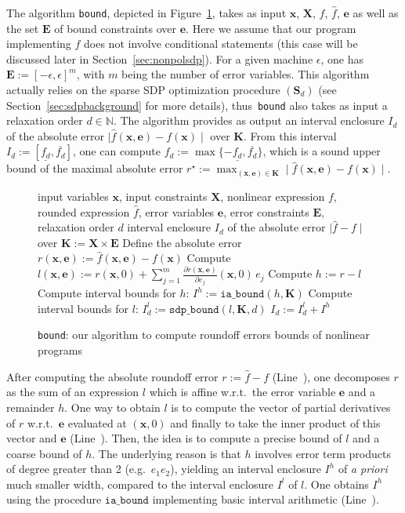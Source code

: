 \documentclass[preprint,fleqn,nocopyrightspace]{sigplanconf}
\newcommand{\code}[1]{\lstinline{#1}}
\newcommand{\N}{\mathbb{N}}
\newcommand{\x}{\mathbf{x}}
\newcommand{\e}{\mathbf{e}}
\def\S{\mathbf{S}}
\def\E{\mathbf{E}}
\def\K{\mathbf{K}}
\def\S{\mathbf{S}}
\def\X{\mathbf{X}}
\newcommand{\iaboundfun}[2]{\mathtt{ia\_bound}(#1, #2)}
\newcommand{\iabound}{\mathtt{ia\_bound}}
\newcommand{\sdpboundfun}[3]{\mathtt{sdp\_bound}(#1, #2, #3)}
\theoremstyle{plain}
\begin{document}
The algorithm \code{bound}, depicted in Figure~\ref{alg:bound}, takes as input $\x$, $\X$, $f$, $\hat{f}$, $\e$ as well as the set $\E$ of bound constraints over $\e$. Here we assume that our program implementing $f$ does not involve conditional statements (this case will be discussed later in Section~\ref{sec:nonpolsdp}). For a given machine $\epsilon$, one has $\E := [-\epsilon, \epsilon]^m$, with $m$ being the number of error variables. This algorithm actually relies on the sparse SDP optimization procedure $(\S_d)$ (see Section~\ref{sec:sdpbackground} for more details), thus~\code{bound} also takes as input a relaxation order $d \in \N$. The algorithm provides as output an interval enclosure $I_d$ of the absolute error $\mid \hat{f}(\x,\e) - f(\x) \mid$ over $\K$. 
From this interval $I_d:= [\underline{f_d}, \overline{f_d}]$, one can compute $f_d := \max \{- \underline{f_d}, \overline{f_d} \}$, which is a sound upper bound of the maximal absolute error $r^\star := \max_{(\x,\e)\in \K} \mid \hat{f}(\x,\e) - f(\x) \mid $.

\begin{figure}[!ht]
\begin{algorithmic}[1]                    
\Require input variables $\x$, input constraints $\X$, nonlinear expression $f$, rounded expression $\hat{f}$, error variables $\e$, error constraints $\E$, relaxation order $d$
\Ensure interval enclosure $I_d$ of the absolute error $\mid \hat{f} - f  \mid$ over $\K := \X \times \E$
\State Define the absolute error $r(\x, \e) := \hat{f}(\x,\e) - f(\x)$ \label{line:r}
\State Compute $l(\x,\e) := r(\x, 0) + \sum_{j=1}^m \frac{\partial r(\x,\e)} {\partial e_j} (\x,0) \, e_j$ \label{line:l}
\State Compute $h := r - l$ \label{line:h}
\State Compute interval bounds for $h$: $I^h := \iaboundfun{h}{\K}$ \label{line:iabound}
\State Compute interval bounds for $l$: $I_d^l := \sdpboundfun{l}{\K}{d}$  \label{line:sdpbound}
\State \Return $I_d := I_d^l + I^h$ 
\end{algorithmic}
\caption{\code{bound}: our algorithm to compute roundoff errors bounds of nonlinear programs}
\label{alg:bound}
\end{figure}

After computing the absolute roundoff error $r := \hat{f} - f$ (Line~), one decomposes $r$ as the sum of an expression $l$ which is affine w.r.t.~the error variable $\e$ and a remainder $h$. One way to obtain $l$ is to compute the vector of partial derivatives of $r$ w.r.t.~$\e$ evaluated at $(\x, 0)$ and finally to take the inner product of this vector and $\e$ (Line~). Then, the idea is to compute a precise bound of $l$ and a coarse bound of $h$. The underlying reason is that $h$ involves error term products of degree greater than 2 (e.g.~$e_1 e_2$), yielding an interval enclosure $I^h$ of \textit{a priori} much smaller width, compared to the interval enclosure $I^l$ of $l$. One obtains $I^h$ using the procedure $\iabound$ implementing basic interval arithmetic (Line~). 
%
\end{document}
